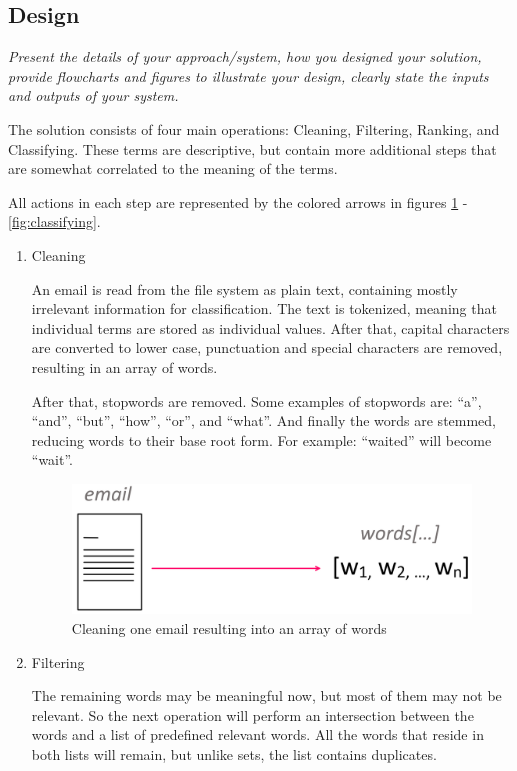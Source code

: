 \documentclass[journal]{IEEEtran}
\begin{document}
\subsection{Design}
\textit{Present the details of your approach/system, how you designed your solution, provide flowcharts and figures to illustrate your design, clearly state the inputs and outputs of your system.}

The solution consists of four main operations: Cleaning, Filtering, Ranking, and Classifying. These terms are descriptive, but contain more additional steps that are somewhat correlated to the meaning of the terms.

All actions in each step are represented by the colored arrows in figures \ref{fig:cleaning} - \ref{fig:classifying}.

\begin{enumerate}
    \item Cleaning

    An email is read from the file system as plain text, containing mostly irrelevant information for classification. The text is tokenized, meaning that individual terms are stored as individual values. After that, capital characters are converted to lower case, punctuation and special characters are removed, resulting in an array of words.

    After that, stopwords are removed. Some examples of stopwords are: ``a'', ``and'', ``but'', ``how'', ``or'', and ``what''. And finally the words are stemmed, reducing words to their base root form. For example: ``waited'' will become ``wait''.

    \begin{figure}[ht!]
        \centering
        \includegraphics[width=.6\linewidth]{res/cleaning}
        \caption{Cleaning one email resulting into an array of words}
        \label{fig:cleaning}
    \end{figure}

    \item Filtering

    The remaining words may be meaningful now, but most of them may not be relevant. So the next operation will perform an intersection between the words and a list of predefined relevant words. All the words that reside in both lists will remain, but unlike sets, the list contains duplicates.


\end{enumerate}
\end{document}
